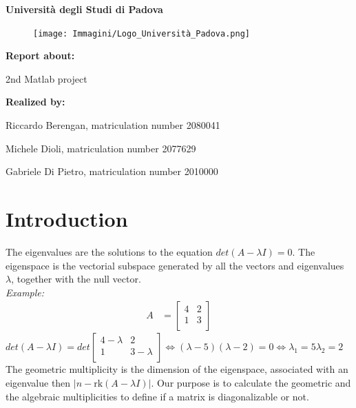\documentclass[12pt]{article}
\newcommand{\abs}[1]{\left|#1\right|}
\renewcommand{\familydefault}{\rmdefault} %
\begin{document}
\begin{titlepage}
    \centering
    {\Huge \textbf{Università degli Studi di Padova} \par}
    \vspace{1cm}
    \begin{figure}[h!]
        \centering
        \texttt{[image: Immagini/Logo\_Università\_Padova.png]}
    \end{figure}
    \vspace{1.5cm}
    {\LARGE \textbf{Report about:} \par}
    {\Huge 2nd Matlab project \par}
    \vfill
    \textbf{Realized by:} \par
    Riccardo Berengan, matriculation number 2080041 \par
    Michele Dioli, matriculation number 2077629 \par
    Gabriele Di Pietro, matriculation number 2010000 \par
    \vspace{0.5cm}
\end{titlepage}
    \renewcommand{\familydefault}{\sfdefault} %
    \fontsize{10}{12}\selectfont
    \newpage
    \section{Introduction}
    The eigenvalues are the solutions to the equation $det(A-\lambda I) = 0$. 
    The eigenspace is the vectorial subspace generated by all the vectors and eigenvalues $\lambda$,
    together with the null vector.\\ \textit{Example:}
    \begin{align*}
        A &= \begin{bmatrix}
            4 & 2 \\
            1 & 3 \\
        \end{bmatrix}
    \end{align*}
    $det(A-\lambda I) = det\begin{bmatrix}
        4-\lambda & 2 \\
        1 & 3-\lambda \\
    \end{bmatrix} \iff (\lambda - 5)(\lambda-2) = 0 \iff \lambda_1 = 5 \lambda_2 = 2$\\
    The geometric multiplicity is the dimension of the eigenspace, associated with an eigenvalue then $\abs{n - \text{rk}(A - \lambda I)}$. Our purpose is to calculate the geometric and the algebraic multiplicities to define if a matrix is diagonalizable or not.
\end{document}
